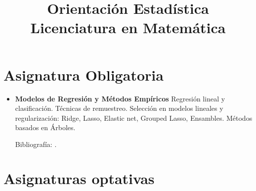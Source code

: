 \documentclass[a4paper, 12pt]{article}
\begin{document}
	
	
	
	

\title{Orientación Estadística\\Licenciatura en Matemática}


 \maketitle

 \newpage


\section{Asignatura Obligatoria}

\begin{itemize}
	\item \textbf{ Modelos de Regresión y Métodos Empíricos}
Regresión lineal y clasificación. Técnicas de remuestreo. Selección en modelos lineales y regularización: Ridge, Lasso, Elastic net, Grouped Lasso, Ensambles.    Métodos basados en Árboles. 

Bibliografía: \cite{friedman, james, trevor, efron}.
\end{itemize}




\section*{Asignaturas optativas}
 
	
	 
 
\end{document}

